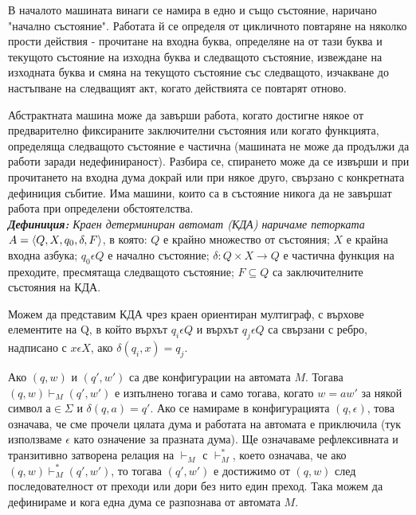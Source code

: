 \documentclass[11pt]{article}
\begin{document}
В началото машината винаги се намира в едно и също състояние, наричано "начално състояние". Работата й се определя от цикличното повтаряне на няколко прости действия - прочитане на входна буква, определяне на от тази буква и текущото състояние на изходна буква и следващото състояние, извеждане на изходната буква и смяна на текущото състояние със следващото, изчакване до настъпване на следващият акт, когато действията се повтарят отново. \par

Абстрактната машина може да завърши работа, когато достигне някое от предварително фиксираните заключителни състояния или когато функцията, определяща следващото състояние е частична (машината не може да продължи да работи заради недефинираност). Разбира се, спирането може да се извърши и при прочитането на входна дума докрай или при някое друго, свързано с конкретната дефиниция събитие. Има машини, които са в състояние никога да не завършат работа при определени обстоятелства. \\ 

\textbf{\emph{Дефиниция:}} \emph{Краен детерминиран автомат (КДА) наричаме петорката} $A = \left\langle Q, X, q_{0}, \delta, F \right\rangle$, в която: $Q$ е крайно множество от състояния; $X$ е крайна входна азбука; $q_{0} \epsilon Q$ е начално състояние; $\delta : Q \times X \to Q$ е частична функция на преходите, пресмятаща следващото състояние; $F \subseteq Q$ са заключителните състояния на КДА. \par

Можем да представим КДА чрез краен ориентиран мултиграф, с върхове елементите на Q, в който върхът $q_{i} \epsilon Q$ и върхът $q_{j} \epsilon Q$ са свързани с ребро, надписано с $x \epsilon X$, ако $\delta(q_{i}, x) = q_{j}$.

 Ако $(q, w)$ и $(q', w')$ са две конфигурации на автомата $M$. Тогава $(q,w) \vdash_{M} (q', w')$ е изпълнено тогава и само тогава, когато $w = aw'$ за някой символ $а \in \Sigma$ и $\delta(q,a) = q'$. Ако се намираме в конфигурацията $(q, \epsilon)$, това означава, че сме прочели цялата дума и работата на автомата е приключила (тук използваме $\epsilon$ като означение за празната дума).
Ще означаваме рефлексивната и транзитивно затворена релация на $\vdash_{M}$ с $\vdash^*_{M}$, което означава, че ако $(q, w) \vdash^{*}_{M} (q', w')$, то тогава $(q', w')$ е достижимо от $(q,w)$ след последователност от преходи или дори без нито един преход. Така можем да дефинираме и кога една дума се разпознава от автомата $M$.
\end{document}

